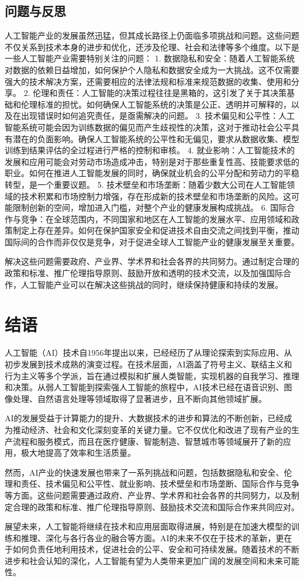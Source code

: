 \subsection{问题与反思}
人工智能产业的发展虽然迅猛，但其成长路径上仍面临多项挑战和问题。这些问题不仅关系到技术本身的进步和优化，还涉及伦理、社会和法律等多个维度。以下是一些人工智能产业需要特别关注的问题：
1. 数据隐私和安全：随着人工智能系统对数据的依赖日益增加，如何保护个人隐私和数据安全成为一大挑战。这不仅需要强大的技术解决方案，还需要相应的法律法规和标准来规范数据的收集、使用和分享。
2. 伦理和责任：人工智能的决策过程往往是黑箱的，这引发了关于其决策基础和伦理标准的担忧。如何确保人工智能系统的决策是公正、透明并可解释的，以及在出现错误时如何追究责任，是亟需解决的问题。
3. 技术偏见和公平性：人工智能系统可能会因为训练数据的偏见而产生歧视性的决策，这对于推动社会公平具有潜在的负面影响。确保人工智能系统的公平性和无偏见，要求从数据收集、模型训练到结果评估的全过程进行严格的控制和审核。
4. 就业影响：人工智能技术的发展和应用可能会对劳动市场造成冲击，特别是对于那些重复性高、技能要求低的职业。如何在推进人工智能发展的同时，确保就业机会的公平分配和劳动力的平稳转型，是一个重要议题。
5. 技术壁垒和市场垄断：随着少数大公司在人工智能领域的技术积累和市场控制力增强，存在形成新的技术壁垒和市场垄断的风险。这可能限制创新的空间，增加进入门槛，对整个产业的健康发展构成挑战。
6. 国际合作与竞争：在全球范围内，不同国家和地区在人工智能的发展水平、应用领域和政策制定上存在差异。如何在保护国家安全和促进技术自由交流之间找到平衡，推动国际间的合作而非仅仅是竞争，对于促进全球人工智能产业的健康发展至关重要。

解决这些问题需要政府、产业界、学术界和社会各界的共同努力。通过制定合理的政策和标准、推广伦理指导原则、鼓励开放和透明的技术交流，以及加强国际合作，人工智能产业可以在解决这些挑战的同时，继续保持健康和持续的发展。

\section{结语}

人工智能（AI）技术自1956年提出以来，已经经历了从理论探索到实际应用、从初步发展到技术成熟的演变过程。在技术层面，AI涵盖了符号主义、联结主义和行为主义等多个学派，旨在通过模拟和扩展人类智能，实现机器的自我学习、推理和决策。从弱人工智能到探索强人工智能的旅程中，AI技术已经在语音识别、图像处理、自然语言处理等领域取得了显著进步，且不断向其他领域扩展。

AI的发展受益于计算能力的提升、大数据技术的进步和算法的不断创新，已经成为推动经济、社会和文化深刻变革的关键力量。它不仅优化和改进了现有产业的生产流程和服务模式，而且在医疗健康、智能制造、智慧城市等领域展开了新的应用，极大地提高了效率和生活质量。

然而，AI产业的快速发展也带来了一系列挑战和问题，包括数据隐私和安全、伦理和责任、技术偏见和公平性、就业影响、技术壁垒和市场垄断、国际合作与竞争等方面。这些问题需要通过政府、产业界、学术界和社会各界的共同努力，以及制定合理的政策和标准、推广伦理指导原则、鼓励技术交流和国际合作来共同应对。

展望未来，人工智能将继续在技术和应用层面取得进展，特别是在加速大模型的训练和推理、深化与各行各业的融合等方面。AI的未来不仅在于技术的革新，更在于如何负责任地利用技术，促进社会的公平、安全和可持续发展。随着技术的不断进步和社会认知的深化，人工智能有望为人类带来更加广阔的发展空间和未来可能性。

